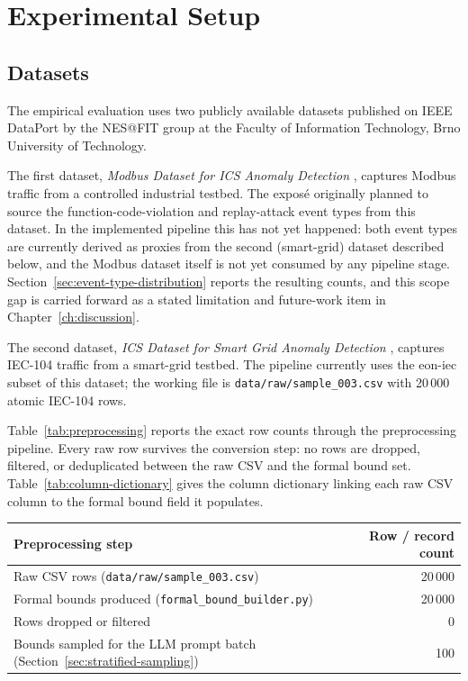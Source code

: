 \chapter{Experimental Setup}
\label{ch:experimental-setup}

\section{Datasets}
\label{sec:datasets}

The empirical evaluation uses two publicly available datasets published on
IEEE DataPort by the NES@FIT group at the Faculty of Information Technology,
Brno University of Technology.

The first dataset, \emph{Modbus Dataset for ICS Anomaly Detection}
\autocite{RysavyMatousek2021Modbus}, captures Modbus traffic from a
controlled industrial testbed. The exposé originally planned to source the
function-code-violation and replay-attack event types from this dataset. In
the implemented pipeline this has not yet happened: both event types are
currently derived as proxies from the second (smart-grid) dataset described
below, and the Modbus dataset itself is not yet consumed by any pipeline
stage. Section~\ref{sec:event-type-distribution} reports the resulting
counts, and this scope gap is carried forward as a stated limitation and
future-work item in Chapter~\ref{ch:discussion}.

The second dataset, \emph{ICS Dataset for Smart Grid Anomaly Detection}
\autocite{MatousekRysavyGrofcik2022SmartGrid}, captures IEC-104 traffic from
a smart-grid testbed. The pipeline currently uses the eon-iec subset of this
dataset; the working file is \texttt{data/raw/sample\_003.csv} with 20\,000
atomic IEC-104 rows.

Table~\ref{tab:preprocessing} reports the exact row counts through the
preprocessing pipeline. Every raw row survives the conversion step: no rows
are dropped, filtered, or deduplicated between the raw CSV and the formal
bound set. Table~\ref{tab:column-dictionary} gives the column dictionary
linking each raw CSV column to the formal bound field it populates.

\begin{center}
\begin{tabular}{lr}
  \toprule
  Preprocessing step & Row / record count \\
  \midrule
  Raw CSV rows (\texttt{data/raw/sample\_003.csv}) & 20\,000 \\
  Formal bounds produced (\texttt{formal\_bound\_builder.py}) & 20\,000 \\
  Rows dropped or filtered & 0 \\
  Bounds sampled for the LLM prompt batch (Section~\ref{sec:stratified-sampling}) & 100 \\
  \bottomrule
\end{tabular}
\label{tab:preprocessing}
\end{center}


